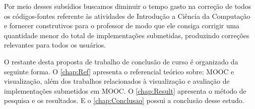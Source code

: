 	Por meio desses subsídios buscamos diminuir o tempo gasto na correção de todos os
	códigos-fontes referente às atividades de Introdução a Ciência da Computação e fornecer
	 construtivos para o professor de modo que ele consiga corrigir
	uma quantidade menor do total de implementações submetidas, produzindo correções
	relevantes para todos os usuários.
	
	O restante desta proposta de trabalho de conclusão de curso é organizado da seguinte
	forma. O \cref{chap:Ref} apresenta o referencial teórico sobre: \acs{MOOC} e visualização,
	além dos trabalhos relacionados à visualização e avaliação de implementações submetidos
	em \acs{MOOC}. O \cref{chap:Result} apresenta o método de pesquisa e os resultados. E
	o \cref{chap:Conclusao} possui a conclusão desse estudo.
